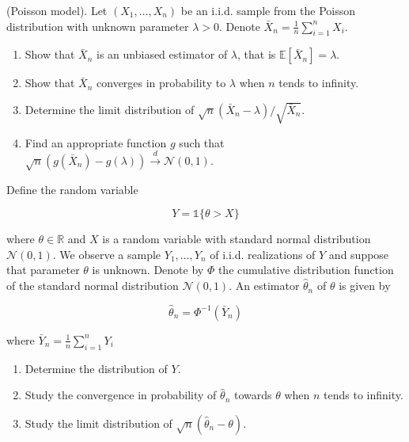 \begin{Exercise}
    (Poisson model). Let $\left(X_{1}, \ldots, X_{n}\right)$ be an i.i.d. sample from the Poisson distribution with unknown parameter $\lambda>0$. Denote $\bar{X}_{n}=\frac{1}{n} \sum_{i=1}^{n} X_{i}$.

\begin{enumerate}
  \item Show that $\bar{X}_{n}$ is an unbiased estimator of $\lambda$, that is $\mathbb{E}\left[\bar{X}_{n}\right]=\lambda$.

  \item Show that $\bar{X}_{n}$ converges in probability to $\lambda$ when $n$ tends to infinity.

  \item Determine the limit distribution of $\sqrt{n}\left(\bar{X}_{n}-\lambda\right) / \sqrt{\bar{X}_{n}}$.

  \item Find an appropriate function $g$ such that $\sqrt{n}\left(g\left(\bar{X}_{n}\right)-g(\lambda)\right) \stackrel{d}{\longrightarrow} \mathcal{N}(0,1)$.

\end{enumerate}
\end{Exercise}


\begin{Exercise}
    Define the random variable

$$
Y=\mathbb{1}\{\theta>X\}
$$

where $\theta \in \mathbb{R}$ and $X$ is a random variable with standard normal distribution $\mathcal{N}(0,1)$. We observe a sample $Y_{1}, \ldots, Y_{n}$ of i.i.d. realizations of $Y$ and suppose that parameter $\theta$ is unknown. Denote by $\Phi$ the cumulative distribution function of the standard normal distribution $\mathcal{N}(0,1)$. An estimator $\hat{\theta}_{n}$ of $\theta$ is given by

$$
\hat{\theta}_{n}=\Phi^{-1}\left(\bar{Y}_{n}\right)
$$

where $\bar{Y}_{n}=\frac{1}{n} \sum_{i=1}^{n} Y_{i}$

\begin{enumerate}
  \item Determine the distribution of $Y$.

  \item Study the convergence in probability of $\hat{\theta}_{n}$ towards $\theta$ when $n$ tends to infinity.

  \item Study the limit distribution of $\sqrt{n}\left(\hat{\theta}_{n}-\theta\right)$.

\end{enumerate}
\end{Exercise}
